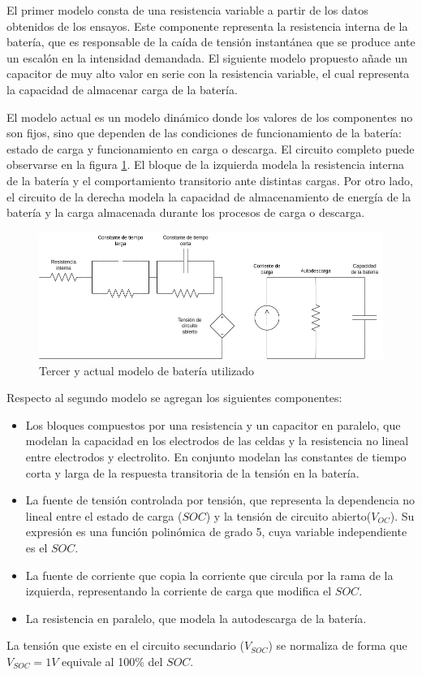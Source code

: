 El primer modelo consta de una resistencia variable a partir de los datos obtenidos de los ensayos. 
Este componente representa la resistencia interna de la batería, que es responsable de la caída de tensión instantánea que se produce ante un escalón en la intensidad demandada.
El siguiente modelo propuesto añade un capacitor de muy alto valor en serie con la resistencia variable,
el cual representa la capacidad de almacenar carga de la batería.

El modelo actual \cite{modelo_bateria_1} es un modelo dinámico donde los valores de los componentes no son fijos,
sino que dependen de las condiciones de funcionamiento de la batería: estado de carga y funcionamiento en carga o descarga.
El circuito completo puede observarse en la figura \ref{fig:modelo_bateria}.
El bloque de la izquierda modela la resistencia interna de la batería y el comportamiento transitorio ante distintas cargas.
Por otro lado, el circuito de la derecha modela la capacidad de almacenamiento de energía de la batería y la carga almacenada durante los procesos de carga o descarga.

\begin{figure}[H]
    \centering
    \includegraphics[width=\textwidth]{images/modelo_bateria.png}
    \caption{Tercer y actual modelo de batería utilizado}
    \label{fig:modelo_bateria}
\end{figure}

Respecto al segundo modelo se agregan los siguientes componentes:
\begin{itemize}
    \item Los bloques compuestos por una resistencia y un capacitor en paralelo, que modelan la capacidad en los electrodos de las celdas y
    la resistencia no lineal entre electrodos y electrolito.
    En conjunto modelan las constantes de tiempo corta y larga de la respuesta transitoria de la tensión en la batería\cite{modelo_bateria_2}.
    \item La fuente de tensión controlada por tensión, que representa la dependencia no lineal entre el estado de carga ($SOC$)
    y la tensión de circuito abierto($V_{OC}$).
    Su expresión es una función polinómica de grado 5, cuya variable independiente es el $SOC$.
    \item La fuente de corriente que copia la corriente que circula por la rama de la izquierda,
    representando la corriente de carga que modifica el $SOC$.
    \item La resistencia en paralelo, que modela la autodescarga de la batería.
\end{itemize}
La tensión que existe en el circuito secundario ($V_{SOC}$) se normaliza de forma que $V_{SOC}=1V$ equivale al 100\% del $SOC$.

